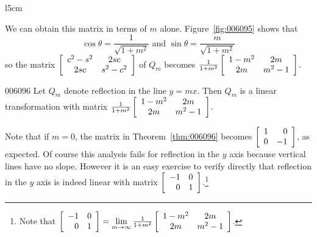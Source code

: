 \begin{wrapfigure}[7]{l}{5cm} 
	\centering
	
	\caption{\label{fig:006095}}
\end{wrapfigure}

We can obtain this matrix in terms of $m$ alone. Figure~\ref{fig:006095} shows that
\begin{equation*}
\cos \theta = \frac{1}{\sqrt{1 + m^2}} \mbox{ and } \sin \theta = \frac{m}{\sqrt{1 + m^2}}
\end{equation*}
so the matrix $\left[ \begin{array}{cc}
c^2 - s^2 & 2sc \\
2sc & s^2 - c^2
\end{array} \right]$
 of $Q_{m}$ becomes $\tfrac{1}{1 + m^2}\left[ \begin{array}{cc}
 1 - m^2 & 2m \\
 2m & m^2 - 1
 \end{array} \right]$.

\hfill \begin{theorem}{}{006096}
Let $Q_{m}$ denote reflection in the line $y = mx$. Then $Q_{m}$ is a linear transformation with matrix $\tfrac{1}{1 + m^2}\left[ \begin{array}{cc}
1 - m^2 & 2m \\
2m & m^2 - 1
\end{array} \right]$.
\end{theorem}

Note that if $m = 0$, the matrix in Theorem~\ref{thm:006096} becomes $\left[ \begin{array}{rr}
1 & 0 \\
0 & -1
\end{array}\right]$,
 as expected. Of course this analysis fails for reflection in the $y$ axis because vertical lines have no slope. However it is an easy exercise to verify directly that reflection in the $y$ axis is indeed linear with matrix $\left[ \begin{array}{rr}
 -1 & 0 \\
 0 & 1
 \end{array}\right]$.\footnote{Note that $\left[ \begin{array}{rr}
 	-1 & 0 \\
 	0 & 1
 	\end{array}\right] = \lim\limits_{m \to \infty}\tfrac{1}{1 + m^2} \left[ \begin{array}{cc}
 	1 - m^2 & 2m \\
 	2m & m^2 - 1
 	\end{array} \right]$.}

